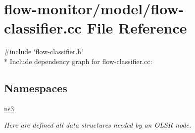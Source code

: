 \hypertarget{flow-classifier_8cc}{}\section{flow-\/monitor/model/flow-\/classifier.cc File Reference}
\label{flow-classifier_8cc}
{\ttfamily \#include \char`\"{}flow-\/classifier.\+h\char`\"{}}\\*
Include dependency graph for flow-\/classifier.cc\+:
\subsection*{Namespaces}
\begin{DoxyCompactItemize}
\item 
 \hyperlink{namespacens3}{ns3}
\begin{DoxyCompactList}\small\item\em Here are defined all data structures needed by an O\+L\+SR node. \end{DoxyCompactList}\end{DoxyCompactItemize}
